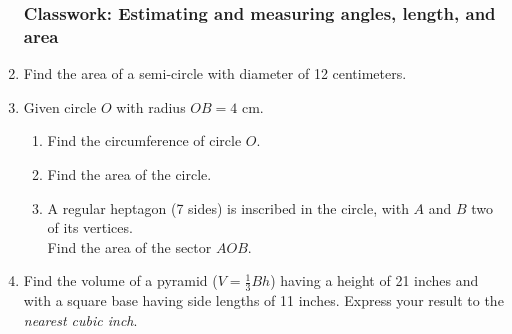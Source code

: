 \documentclass[12pt, twoside]{article}
\begin{document}
\begin{enumerate}
\newpage 
\subsubsection*{Classwork: Estimating and measuring angles, length, and area} 
  \item Find the area of a semi-circle with diameter of 12 centimeters.
   \begin{flushright}
  \end{flushright}

  \item Given circle $O$ with radius $OB=4$ cm.
    \begin{multicols}{2}
    \raggedcolumns
    \begin{enumerate}
      \item Find the circumference of circle $O$. \vspace{1.7cm}
      \item Find the area of the circle.  \vspace{2cm}
      \item A regular heptagon (7 sides) is inscribed in the circle, with $A$ and $B$ two of its vertices. \\[0.25cm]
      Find the area of the sector $AOB$. \vspace{1.5cm}
    \end{enumerate}
    \end{multicols}  \vspace{3cm}

  \item Find the volume of a pyramid ($V=\frac{1}{3}Bh$) having a height of 21 inches and with a square base having side lengths of 11 inches. Express your result to the \emph{nearest cubic inch}. \vspace{5cm}


\end{enumerate}
\end{document}

